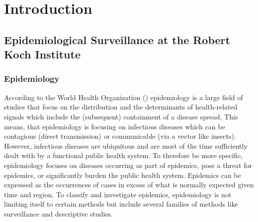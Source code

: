 \chapter{Introduction}
%
%
%


\section{Epidemiological Surveillance at the Robert Koch Institute}

\subsection{Epidemiology}
According to the World Health Organization () \citep{WHOepi} epidemiology is a large field of studies that focus
on the distribution and the determinants of health-related signals which include the (subsequent)
containment of a disease spread. This means, that epidemiology is focusing on infectious diseases which can be contagious (direct transmission) or communicable (via a vector like insects). However, infectious diseases are ubiquitous and are most of the time sufficiently dealt with by a functional public health system. To therefore be more specific, epidemiology focuses on diseases occurring as part of epidemics, pose a threat for epidemics, or significantly burden the public health system. Epidemics can be expressed as the occurrences of cases in excess of what is normally expected given time and region. To classify and investigate epidemics, epidemiology is not limiting itself to certain methods but include several families of methods like surveillance and descriptive studies.



